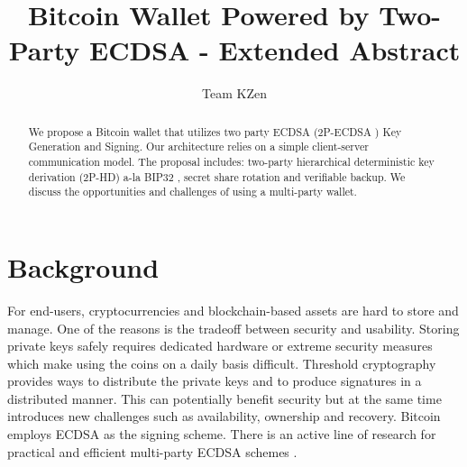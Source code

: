 \documentclass[runningheads]{llncs}
\begin{document}
%
\title{Bitcoin Wallet Powered by Two-Party ECDSA - Extended Abstract}
%
%
\author{Team KZen}
%
%
%
\maketitle              %
%
\begin{abstract}
We propose a Bitcoin wallet that utilizes two party ECDSA (2P-ECDSA \cite{lindell17}) Key Generation and Signing. Our architecture relies on a simple client-server communication model. The proposal includes: two-party hierarchical deterministic key derivation (2P-HD) a-la BIP32 \cite{bip32}, secret share rotation and verifiable backup. We discuss the opportunities and challenges of using a multi-party wallet. 
 
 
\end{abstract}
%
%
%
\section{Background}
For end-users, cryptocurrencies and blockchain-based assets are hard to store and manage. One of the reasons is the tradeoff between security and usability. Storing private keys safely requires dedicated hardware or extreme security measures which make using the coins on a daily basis difficult. Threshold cryptography provides ways to distribute the private keys and to produce signatures in a distributed manner. This can potentially benefit security but at the same time introduces new challenges such as availability, ownership and recovery.
Bitcoin employs ECDSA as the signing scheme. There is an active line of research for practical and efficient multi-party ECDSA schemes \cite{mackenzie,boneh17,lindell17,doerner,goldfeder18,lindell18}.
\end{document}
